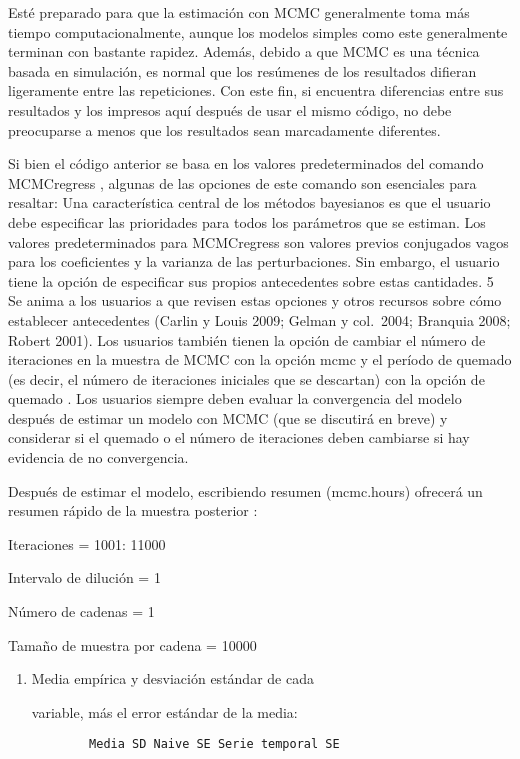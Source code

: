 \documentclass[
]{book}
\begin{document}
Esté preparado para que la estimación con MCMC generalmente toma más tiempo computacionalmente, aunque los modelos simples como este generalmente terminan con bastante rapidez. Además, debido a que MCMC es una técnica basada en simulación, es normal que los resúmenes de los resultados difieran ligeramente entre las repeticiones. Con este fin, si encuentra diferencias entre sus resultados y los impresos aquí después de usar el mismo código, no debe preocuparse a menos que los resultados sean marcadamente diferentes.

Si bien el código anterior se basa en los valores predeterminados del comando MCMCregress , algunas de las opciones de este comando son esenciales para resaltar: Una característica central de los métodos bayesianos es que el usuario debe especificar las prioridades para todos los parámetros que se estiman. Los valores predeterminados para MCMCregress son valores previos conjugados vagos para los coeficientes y la varianza de las perturbaciones. Sin embargo, el usuario tiene la opción de especificar sus propios antecedentes sobre estas cantidades. 5 Se anima a los usuarios a que revisen estas opciones y otros recursos sobre cómo establecer antecedentes (Carlin y Louis 2009; Gelman y col.~2004; Branquia 2008; Robert 2001). Los usuarios también tienen la opción de cambiar el número de iteraciones en la muestra de MCMC con la opción mcmc y el período de quemado (es decir, el número de iteraciones iniciales que se descartan) con la opción de quemado . Los usuarios siempre deben evaluar la convergencia del modelo después de estimar un modelo con MCMC (que se discutirá en breve) y considerar si el quemado o el número de iteraciones deben cambiarse si hay evidencia de no convergencia.

Después de estimar el modelo, escribiendo resumen (mcmc.hours) ofrecerá un resumen rápido de la muestra posterior :

Iteraciones = 1001: 11000

Intervalo de dilución = 1

Número de cadenas = 1

Tamaño de muestra por cadena = 10000

\begin{enumerate}
\def\labelenumi{\arabic{enumi}.}
\item
  Media empírica y desviación estándar de cada

  variable, más el error estándar de la media:

\begin{verbatim}
        Media SD Naive SE Serie temporal SE
\end{verbatim}
\end{enumerate}
\end{document}
